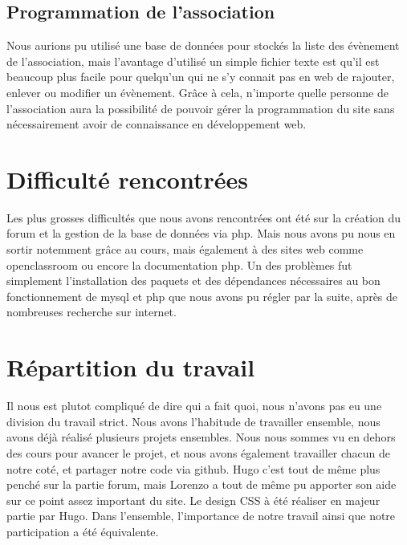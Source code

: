 \documentclass[a4paper, 12pt]{article}
\begin{document}
\subsection{Programmation de l'association}
Nous aurions pu utilisé une base de données pour stockés la liste des évènement de l'association, mais l'avantage d'utilisé un simple fichier texte est qu'il est beaucoup plus facile pour quelqu'un qui ne s'y connait pas en web de rajouter, enlever ou modifier un évènement. Grâce à cela, n'importe quelle personne de l'association aura la possibilité de pouvoir gérer la programmation du site sans nécessairement avoir de connaissance en développement web.

\section{Difficulté rencontrées}
Les plus grosses difficultés que nous avons rencontrées ont été sur la création du forum et la gestion de la base de données via php. Mais nous avons pu nous en sortir notemment grâce au cours, mais également à des sites web comme openclassroom ou encore la documentation php.
Un des problèmes fut simplement l'installation des paquets et des dépendances nécessaires au bon fonctionnement de mysql et php que nous avons pu régler par la suite, après de nombreuses recherche sur internet.

\section{Répartition du travail}
Il nous est plutot compliqué de dire qui a fait quoi, nous n'avons pas eu une division du travail strict. Nous avons l'habitude de travailler ensemble, nous avons déjà réalisé plusieurs projets ensembles. Nous nous sommes vu en dehors des cours pour avancer le projet, et nous avons également travailler chacun de notre coté, et partager notre code via github.
Hugo c'est tout de même plus penché sur la partie forum, mais Lorenzo a tout de même pu apporter son aide sur ce point assez important du site. Le design CSS à été réaliser en majeur partie par Hugo.
Dans l'ensemble, l'importance de notre travail ainsi que notre participation a été équivalente.
\end{document}
